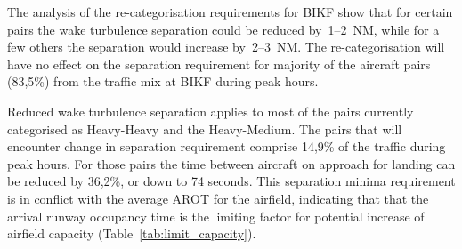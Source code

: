 
The analysis of the re-categorisation requirements for BIKF show that for certain pairs the wake turbulence separation could be reduced by~1--2~NM, while for a few others the separation would increase by~2--3~NM. The re-categorisation will have no effect on the separation requirement for majority of the aircraft pairs (83,5\%) from the traffic mix at BIKF during peak hours. 

Reduced wake turbulence separation applies to most of the pairs currently categorised as Heavy-Heavy and the Heavy-Medium. 
The pairs that will encounter change in separation requirement comprise 14,9\% of the traffic during peak hours. For those pairs the time between aircraft on approach for landing can be reduced by 36,2\%, or down to 74 seconds. This separation minima requirement is in conflict with the average AROT for the airfield, indicating that that the arrival runway occupancy time is the limiting factor for potential increase of airfield capacity (Table~\ref{tab:limit_capacity}).

